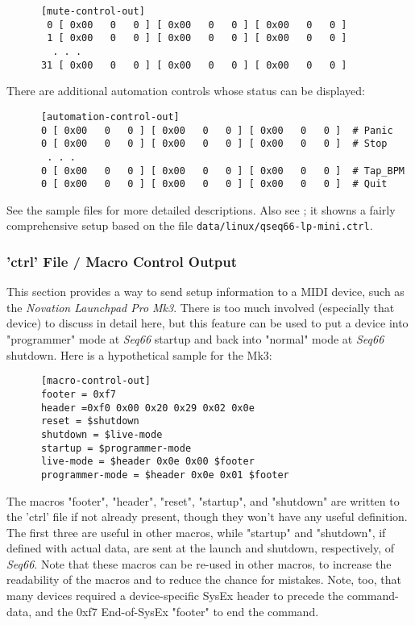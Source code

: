    \begin{verbatim}
      [mute-control-out]
       0 [ 0x00   0   0 ] [ 0x00   0   0 ] [ 0x00   0   0 ]
       1 [ 0x00   0   0 ] [ 0x00   0   0 ] [ 0x00   0   0 ]
        . . .
      31 [ 0x00   0   0 ] [ 0x00   0   0 ] [ 0x00   0   0 ]
   \end{verbatim}

   There are additional automation controls whose status can be displayed:

   \begin{verbatim}
      [automation-control-out]
      0 [ 0x00   0   0 ] [ 0x00   0   0 ] [ 0x00   0   0 ]  # Panic
      0 [ 0x00   0   0 ] [ 0x00   0   0 ] [ 0x00   0   0 ]  # Stop
       . . .
      0 [ 0x00   0   0 ] [ 0x00   0   0 ] [ 0x00   0   0 ]  # Tap_BPM
      0 [ 0x00   0   0 ] [ 0x00   0   0 ] [ 0x00   0   0 ]  # Quit
   \end{verbatim}

   See the sample files for more detailed descriptions.
   Also see ; it showns a fairly comprehensive
   setup based on the file \texttt{data/linux/qseq66-lp-mini.ctrl}.

\subsubsection{'ctrl' File / Macro Control Output}
\label{subsubsec:configuration_ctrl_macro_control_out}

   This section provides a way to send setup information to a MIDI device,
   such as the \textsl{Novation Launchpad Pro Mk3}.
   There is too much involved (especially that device) to discuss in
   detail here, but this feature can be used to put a device into
   "programmer" mode at \textsl{Seq66} startup and back into
   "normal" mode at \textsl{Seq66} shutdown.
   Here is a hypothetical sample for the Mk3:

   \begin{verbatim}
      [macro-control-out]
      footer = 0xf7
      header =0xf0 0x00 0x20 0x29 0x02 0x0e 
      reset = $shutdown
      shutdown = $live-mode
      startup = $programmer-mode
      live-mode = $header 0x0e 0x00 $footer
      programmer-mode = $header 0x0e 0x01 $footer
   \end{verbatim}

   The macros "footer", "header", "reset", "startup", and "shutdown"
   are written to the 'ctrl' file if not already present, though
   they won't have any useful definition.
   The first three are useful in other macros, while "startup" and
   "shutdown", if defined with actual data, are sent at the launch
   and shutdown, respectively, of \textsl{Seq66}.
   Note that these macros can be re-used in other macros, to
   increase the readability of the macros and to reduce the
   chance for mistakes.
   Note, too, that many devices required a device-specific
   SysEx header to precede the command-data, and the 0xf7
   End-of-SysEx "footer" to end the command.

